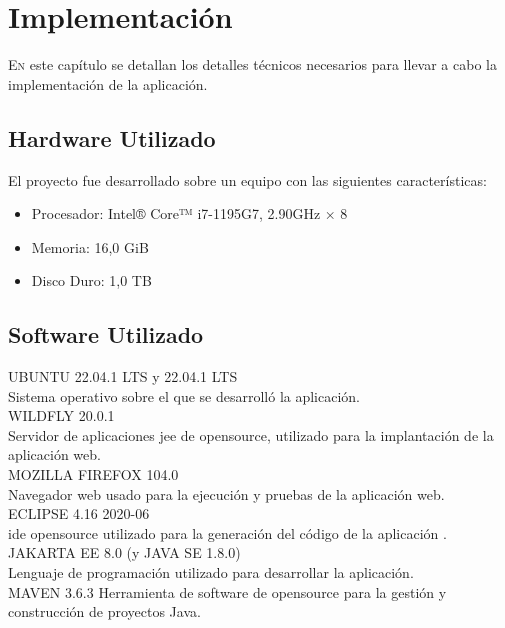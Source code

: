 \chapter{Implementación}
\label{chap:implementacion}


\lettrine{E}{n} este capítulo se detallan los detalles técnicos necesarios para llevar a cabo la implementación de la aplicación.


\section{Hardware Utilizado}
\label{sec:hw}
El proyecto fue desarrollado sobre un equipo con las siguientes características:

\begin{itemize}
\item Procesador: Intel® Core™ i7-1195G7, 2.90GHz × 8
\item Memoria: 16,0 GiB
\item Disco Duro: 1,0 TB
\end{itemize}
	

\section{Software Utilizado}
\label{sec:sw}	

 UBUNTU 22.04.1 LTS y 22.04.1 LTS\\
 Sistema operativo sobre el que se desarrolló la aplicación.
 \\	 
 
 WILDFLY 20.0.1\\
 Servidor de aplicaciones \acrshort{jee} de \gls{opensource}, utilizado para la implantación de la aplicación web.
 \\
 
 MOZILLA FIREFOX 104.0\\
 Navegador web usado para la ejecución y pruebas de la aplicación web.
 \\ 
 
 ECLIPSE 4.16 2020-06\\
 \acrfull{ide} \gls{opensource} utilizado para la generación del código de la aplicación .
 \\
 
 JAKARTA EE 8.0 (y JAVA SE 1.8.0)\\
 Lenguaje de programación utilizado para desarrollar la aplicación.
 \\
 
 MAVEN 3.6.3
 Herramienta de software de \gls{opensource} para la gestión y construcción de proyectos Java.
 \\

